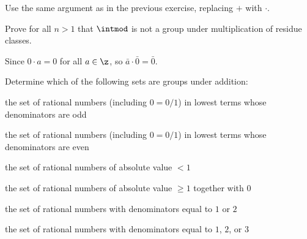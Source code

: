 \begin{sol}
    Use the same argument as in the previous exercise, replacing $+$ with $\cdot$.
\end{sol}

\begin{exercise}\label{ex1.1.5}
    Prove for all $n > 1$ that $\intmod$ is not a group under multiplication of residue classes.
\end{exercise}

\begin{sol}
    Since $0 \cdot a = 0$ for all $a \in \z$, so $\bar a \cdot \bar 0 = \bar 0$.
\end{sol}

\begin{exercise}\label{ex1.1.6}
    Determine which of the following sets are groups under addition:
\begin{subproblems}
    \item the set of rational numbers (including $0 = 0/1$) in lowest terms whose denominators are odd
    \item the set of rational numbers (including $0 = 0/1$) in lowest terms whose denominators are even
    \item the set of rational numbers of absolute value $< 1$
    \item the set of rational numbers of absolute value $\ge 1$ together with $0$
    \item the set of rational numbers with denominators equal to $1$ or $2$
    \item the set of rational numbers with denominators equal to $1$, $2$, or $3$
\end{subproblems}
\end{exercise}

